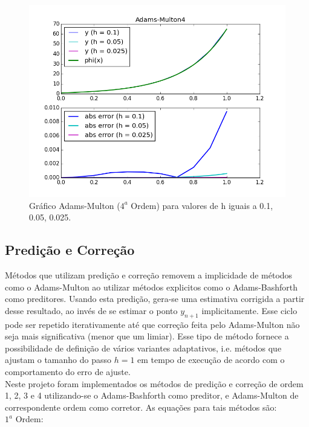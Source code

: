 \documentclass[a4paper]{article}
\begin{document}
\begin{figure}[b]
\centering
\includegraphics[width=1.0\textwidth]{plots/Adams-Multon4.png}
\caption{\label{fig:multon4}Gráfico Adams-Multon ($4^a$ Ordem) para valores de h iguais a 0.1, 0.05, 0.025.}
\end{figure}

\pagebreak

\subsection{Predição e Correção}

Métodos que utilizam predição e correção removem a implicidade de métodos como o Adams-Multon ao utilizar métodos explicitos como o Adams-Bashforth como preditores. Usando esta predição, gera-se uma estimativa corrigida a partir desse resultado, ao invés de se estimar o ponto $y_{n+1}$ implicitamente. Esse ciclo pode ser repetido iterativamente até que correção feita pelo Adams-Multon não seja mais significativa (menor que um limiar). Esse tipo de método fornece a possibilidade de definição de vários variantes adaptativos, i.e. métodos que ajustam o tamanho do passo $h=1$ em tempo de execução de acordo com o comportamento do erro de ajuste.
\\
Neste projeto foram implementados os métodos de predição e correção de ordem 1, 2, 3 e 4 utilizando-se o Adams-Bashforth como preditor, e Adams-Multon de correspondente ordem como corretor. As equações para tais métodos são:
\vspace{10mm} %
\\
$1^a$ Ordem: 
\end{document}
